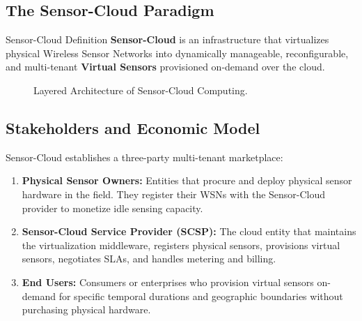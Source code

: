 \subsection{The Sensor-Cloud Paradigm}
\begin{defbox}{Sensor-Cloud Definition}
\textbf{Sensor-Cloud} is an infrastructure that virtualizes physical Wireless Sensor Networks into dynamically manageable, reconfigurable, and multi-tenant \textbf{Virtual Sensors} provisioned on-demand over the cloud.
\end{defbox}

\begin{figure}[H]
\centering
{}
\caption{Layered Architecture of Sensor-Cloud Computing.}
\end{figure}

\subsection{Stakeholders and Economic Model}
Sensor-Cloud establishes a three-party multi-tenant marketplace:
\begin{enumerate}[leftmargin=*]
  \item \textbf{Physical Sensor Owners:} Entities that procure and deploy physical sensor hardware in the field. They register their WSNs with the Sensor-Cloud provider to monetize idle sensing capacity.
  \item \textbf{Sensor-Cloud Service Provider (SCSP):} The cloud entity that maintains the virtualization middleware, registers physical sensors, provisions virtual sensors, negotiates SLAs, and handles metering and billing.
  \item \textbf{End Users:} Consumers or enterprises who provision virtual sensors on-demand for specific temporal durations and geographic boundaries without purchasing physical hardware.
\end{enumerate}

